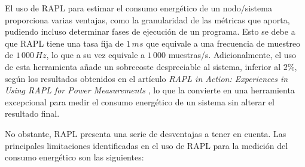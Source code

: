   El uso de RAPL para estimar el consumo energético de un nodo/sistema proporciona varias ventajas, como la granularidad de las métricas que aporta, pudiendo incluso determinar fases de ejecución de un programa. Esto se debe a que RAPL tiene una tasa fija de $1\,ms$ que equivale a una frecuencia de muestreo de $1\,000\,Hz$, lo que a su vez equivale a $1\,000$ muestras/s. Adicionalmente, el uso de esta herramienta añade un sobrecoste despreciable al sistema, inferior al $2\%$, según los resultados obtenidos en el artículo \textit{RAPL in Action: Experiences in Using RAPL for Power Measurements} \cite{rapl-tool}, lo que la convierte en una herramienta excepcional para medir el consumo energético de un sistema sin alterar el resultado final.

  No obstante, RAPL presenta una serie de desventajas a tener en cuenta. Las principales limitaciones identificadas en el uso de RAPL para la medición del consumo energético son las siguientes:
  
